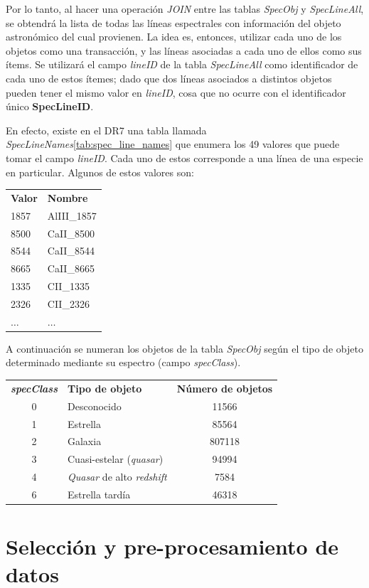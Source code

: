 Por lo tanto, al hacer una operación \textit{JOIN} entre las tablas \textit{SpecObj} y \textit{SpecLineAll}, se obtendrá la lista de todas las líneas espectrales con información del objeto astronómico del cual provienen. La idea es, entonces, utilizar cada uno de los objetos como una transacción, y las líneas asociadas a cada uno de ellos como sus ítems. Se utilizará el campo \textit{lineID} de la tabla \textit{SpecLineAll} como identificador de cada uno de estos ítemes; dado que dos líneas asociados a distintos objetos pueden tener el mismo valor en \textit{lineID}, cosa que no ocurre con el identificador único \textbf{SpecLineID}. 

En efecto, existe en el DR7 una tabla llamada \textit{SpecLineNames}\ref{tab:spec_line_names} que enumera los 49 valores que puede tomar el campo \textit{lineID}. Cada uno de estos corresponde a una línea de una especie en particular. Algunos de estos valores son:

\begin{tabular}{l l}
\textbf{Valor} & \textbf{Nombre} \\
1857 & AlIII\_1857 \\
8500 & CaII\_8500 \\
8544 & CaII\_8544 \\
8665 & CaII\_8665 \\
1335 & CII\_1335 \\
2326 & CII\_2326 \\
$\ldots$ & $\ldots$ \\
\end{tabular}

A continuación se numeran los objetos de la tabla \textit{SpecObj} según el tipo de objeto determinado mediante su espectro (campo \textit{specClass}).

\begin{tabular}{c l c}
\textbf{\textit{specClass}} & \textbf{Tipo de objeto} & \textbf{Número de objetos}\\
0 & Desconocido & 11566 \\
1 & Estrella & 85564 \\
2 & Galaxia & 807118 \\
3 & Cuasi-estelar (\textit{quasar}) & 94994 \\
4 & \textit{Quasar} de alto \textit{redshift} & 7584 \\
6 & Estrella tardía & 46318 \\
\end{tabular}

\section{Selección y pre-procesamiento de datos}

